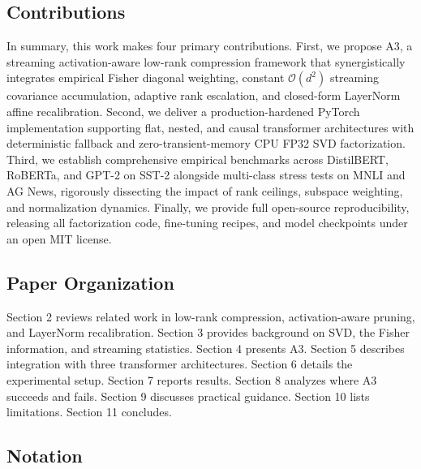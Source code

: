 \subsection{Contributions}

In summary, this work makes four primary contributions. First, we propose A3, a streaming activation-aware low-rank compression framework that synergistically integrates empirical Fisher diagonal weighting, constant $\mathcal{O}(d^2)$ streaming covariance accumulation, adaptive rank escalation, and closed-form LayerNorm affine recalibration. Second, we deliver a production-hardened PyTorch implementation supporting flat, nested, and causal transformer architectures with deterministic fallback and zero-transient-memory CPU FP32 SVD factorization. Third, we establish comprehensive empirical benchmarks across DistilBERT, RoBERTa, and GPT-2 on SST-2 alongside multi-class stress tests on MNLI and AG News, rigorously dissecting the impact of rank ceilings, subspace weighting, and normalization dynamics. Finally, we provide full open-source reproducibility, releasing all factorization code, fine-tuning recipes, and model checkpoints under an open MIT license.
\subsection{Paper Organization}

Section 2 reviews related work in low-rank compression, activation-aware 
pruning, and LayerNorm recalibration. Section 3 provides background on SVD, 
the Fisher information, and streaming statistics. Section 4 presents A3. 
Section 5 describes integration with three transformer architectures. Section 
6 details the experimental setup. Section 7 reports results. Section 8 
analyzes where A3 succeeds and fails. Section 9 discusses practical guidance. 
Section 10 lists limitations. Section 11 concludes.



\subsection{Notation}
\label{sec:notation}

